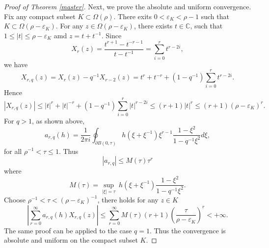 \documentclass[10pt,a4paper]{amsart}
\begin{document}
\begin{proof}[Proof of Theorem \ref{master}]
Next, we prove the absolute and uniform convergence. Fix any compact subset $K\subset \Omega(\rho)$. There exits $0<\varepsilon_K<\rho-1$ such that $K\subset \Omega(\rho-\varepsilon_K)$. For any $z\in \Omega(\rho-\varepsilon_K)$, there exists $t\in \mathbb{C}$, such that $1\leq |t|\leq \rho-\varepsilon_K$ amd $z=t+t^{-1}$.
Since $$
    X_r(z)=\frac{t^{r+1}-t^{-r-1}}{t-t^{-1}}=\sum_{i=0}^{r}t^{r-2i},
$$
we have 
$$X_{r,q}(z)=X_r(z)-q^{-1}X_{r-2}(z)=t^{r}+t^{-r}+(1-q^{-1})\sum_{i=0}^{r}t^{r-2i}.$$
Hence
$$|X_{r,q}(z)|\leq |t|^{r}+|t|^{-r}+(1-q^{-1})\sum_{i=0}^{r}|t|^{r-2i}\leq (r+1)|t|^{r}\leq (r+1) (\rho-\varepsilon_K)^r.$$
For $q>1$, as shown above,
$$a_{r,q}(h)=\frac{1}{2\pi i}\oint_{\partial B(0, \tau)} h(\xi+\xi^{-1})\xi^{r-1}\frac{1-\xi^2}{1-q^{-1}\xi^2}d\xi,$$
for all $ \rho^{-1}<\tau\leq 1$. Thus 
$$|a_{r,q}|\leq M(\tau) \tau^r$$
where $$M(\tau)=\sup_{|\xi|=\tau}\ h(\xi+\xi^{-1})\frac{1-\xi^2}{1-q^{-1}\xi^2}.$$
Choose $\rho^{-1} <\tau<(\rho-\varepsilon_K)^{-1}$, there holds for any $z\in K$
$$\left|\sum_{r=0}^{\infty} a_{r,q}(h) X_{r,q}(z)\right|\leq \sum_{r=0}^{\infty} M(\tau) (r+1) \left(\frac{\tau}{\rho-\varepsilon_K}\right) ^r<+\infty.$$
The same proof can be applied to the case $q=1$. Thus the convergence is absolute and uniform on the compact subset $K$. 
\end{proof}
\end{document}
